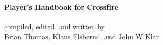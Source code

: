 \thispagestyle{empty}
\dblesp

%
\noindent
\begin{center}
%
{\large \bf Player's Handbook for Crossfire}\\[0.5 cm]
 \\[1.0 cm]
%
compiled, edited, and written by\\[0.5 cm]
Brian Thomas, Klaus Elsbernd, and John W Klar \\
%
\end{center}
